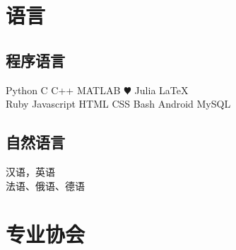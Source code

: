 \documentclass[]{deedy-resume-openfont}
\begin{document}
\section{语言}
\begin{minipage}[t]{.6\textwidth}
\subsection{程序语言}
Python \textbullet{}
C \textbullet{}
C++ \textbullet{}
MATLAB \textbullet{}
{\color{red} $\varheartsuit$} Julia \textbullet{}
\LaTeX \\
Ruby \textbullet{}
Javascript \textbullet{}
HTML \textbullet{}
CSS \textbullet{}
Bash \textbullet{}
Android \textbullet{}
MySQL
\sectionsep
\end{minipage}
\hfill
\begin{minipage}[t]{.35\textwidth}
\subsection{自然语言}
 汉语，英语\\
 法语、俄语、德语\\
\end{minipage}

\sectionsep


\section{专业协会}

\sectionsep
{}

\sectionsep



\renewcommand\refname{论文} %
\nocite{*} %

\sectionsep

\end{document}
